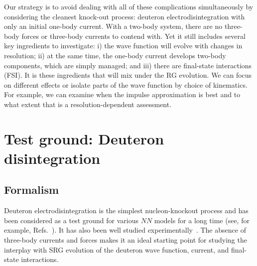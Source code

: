 	Our strategy is to avoid dealing with all of these complications
	simultaneously
	by considering the cleanest knock-out process: deuteron electrodisintegration
	with only an initial one-body current.  With a two-body system, there are no
	three-body forces or three-body currents to contend with.  Yet it still
	includes several key ingredients to investigate: i) the wave function will
	evolve with changes in resolution; ii) at the same time, the one-body current
	develops two-body components, which are simply managed; and iii) there are
	final-state interactions (FSI).  It is these ingredients that will mix under
	the RG evolution.  We can focus on different effects or isolate parts of the
	wave function by choice of kinematics.  For example, we can examine when the
	impulse approximation is best and to what extent that is a
	resolution-dependent assessment.


	\section{Test ground: Deuteron disintegration}

	\subsection{Formalism}
	\label{subsec:formalism}

	Deuteron electrodisintegration is the simplest nucleon-knockout process
	and has been considered as a test ground for various $NN$ models for a
	long time (see, for example, Refs.~\cite{Arenhovel:2004bc,Boeglin:2015cha}).
	It has also been well studied
	experimentally~\cite{Gilad:1998wia,Egiyan:2007qj}.
	The absence of three-body currents and forces
	makes it an ideal starting point for studying the interplay with SRG evolution
	of the deuteron wave function, current, and final-state interactions.

